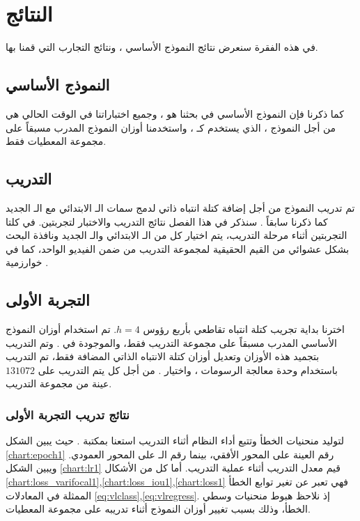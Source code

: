 \section{النتائج}
في هذه الفقرة سنعرض نتائج النموذج الأساسي 
،
ونتائج التجارب التي قمنا بها.
\subsection{النموذج الأساسي
}
كما ذكرنا فإن النموذج الأساسي في بحثنا هو
،
وجميع اختباراتنا في الوقت الحالي هي من أجل النموذج
،
الذي يستخدم 
كـ
،
واستخدمنا أوزان النموذج المدرب مسبقاً
على مجموعة المعطيات 
فقط.
\subsection{التدريب}
تم تدريب النموذج من أجل إضافة كتلة انتباه ذاتي لدمج سمات الـ 
الابتدائي مع الـ
الجديد كما ذكرنا سابقاً .
سنذكر في هذا الفصل نتائج التدريب والاختبار لتجربتين.
في كلتا التجربتين أثناء مرحلة التدريب، يتم اختيار كل من الـ 
الابتدائي والـ
الجديد ونافذة البحث بشكل عشوائي من القيم الحقيقية لمجموعة التدريب من ضمن الفيديو الواحد، كما في خوارزمية
.
\newline
\subsection{التجربة الأولى}
اخترنا بداية تجريب كتلة انتباه تقاطعي بأربع رؤوس
$h = 4$.
تم استخدام أوزان النموذج الأساسي المدرب مسبقاً على مجموعة التدريب 
فقط، والموجودة في 
.
وتم التدريب بتجميد هذه الأوزان وتعديل أوزان كتلة الانتباه الذاتي المضافة فقط، 
تم التدريب باستخدام وحدة معالجة الرسومات 
،
واختيار 
.
من أجل كل
يتم التدريب على 
$131072$ 
عينة من مجموعة التدريب.
\subsubsection{نتائج تدريب التجربة الأولى}
لتوليد منحنيات الخطأ وتتبع أداء النظام أثناء التدريب استعنا بمكتبة
.
حيث يبين الشكل 
\ref{chart:epoch1}
رقم العينة على المحور الأفقي، بينما رقم الـ
على المحور العمودي.
ويبين الشكل 
\ref{chart:lr1}
قيم معدل التدريب 
أثناء عملية التدريب. 
\newline
أما كل من الأشكال
\ref{chart:loss_varifocal1},\ref{chart:loss_iou1},\ref{chart:loss1}
فهي تعبر عن تغير توابع الخطأ الممثلة في المعادلات
\ref{eq:vlclass},\ref{eq:vlregress}.
إذ نلاحظ هبوط منحنيات وسطي الخطأ، وذلك بسبب تغيير أوزان النموذج أثناء تدريبه على مجموعة المعطيات.

